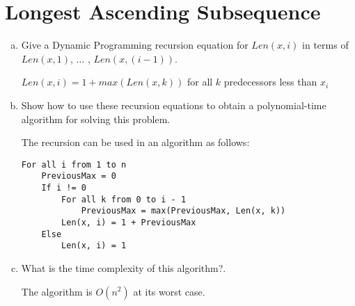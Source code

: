 \documentclass[12pt]{article}
\begin{document}
\section{Longest Ascending Subsequence}\label{ascending subsequence}
\begin{enumerate}[(a)]
\item Give a Dynamic Programming recursion equation for $Len(x,i)$ in terms of $Len(x,1)$, ... , $Len(x,(i-1))$.
\begin{addmargin}[2em]{2em}
$Len(x, i) = 1 + max(Len(x, k))$ for all $k$ predecessors less than $x_i$
\end{addmargin}
\item Show how to use these recursion equations to obtain a polynomial-time algorithm for solving this problem.
\begin{addmargin}[2em]{2em}
The recursion can be used in an algorithm as follows:
\begin{lstlisting}
For all i from 1 to n
	PreviousMax = 0
	If i != 0
		For all k from 0 to i - 1
			PreviousMax = max(PreviousMax, Len(x, k))
		Len(x, i) = 1 + PreviousMax
	Else
		Len(x, i) = 1
\end{lstlisting}
\end{addmargin}
\item What is the time complexity of this algorithm?.
\begin{addmargin}[2em]{2em}
The algorithm is $O(n^2)$ at its worst case.
\end{addmargin}
\end{enumerate}
\end{document}

